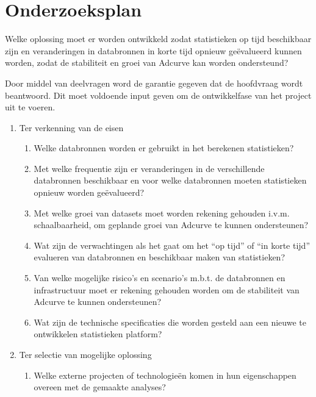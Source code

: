 \chapter{Onderzoeksplan}

Welke oplossing moet er worden ontwikkeld zodat statistieken op tijd beschikbaar zijn en veranderingen in databronnen in korte tijd opnieuw geëvalueerd kunnen worden, zodat de stabiliteit en groei van Adcurve kan worden ondersteund?

Door middel van deelvragen word de garantie gegeven dat de hoofdvraag wordt beantwoord. Dit moet voldoende input geven om de ontwikkelfase van het project uit te voeren.

\begin{enumerate}
\item Ter verkenning van de eisen
    \begin{enumerate}
    \item Welke databronnen worden er gebruikt in het berekenen statistieken?

    \item Met welke frequentie zijn er veranderingen in de verschillende databronnen beschikbaar en voor welke databronnen moeten statistieken opnieuw worden geëvalueerd?

    \item Met welke groei van datasets moet worden rekening gehouden i.v.m. schaalbaarheid, om geplande groei van Adcurve te kunnen ondersteunen?

    \item Wat zijn de verwachtingen als het gaat om het “op tijd” of “in korte tijd” evalueren van databronnen en beschikbaar maken van statistieken?

    \item Van welke mogelijke risico’s en scenario’s m.b.t. de databronnen en infrastructuur moet er rekening gehouden worden om de stabiliteit van Adcurve te kunnen ondersteunen?

    \item Wat zijn de technische specificaties die worden gesteld aan een nieuwe te ontwikkelen statistieken platform?
    \end{enumerate}

\item Ter selectie van mogelijke oplossing
    \begin{enumerate}

    \item Welke externe projecten of technologieën komen in hun eigenschappen overeen met de gemaakte analyses?


\end{enumerate}
\end{enumerate}
